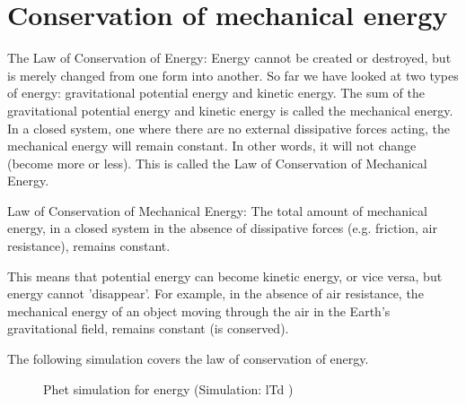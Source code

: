 \section{Conservation of mechanical energy}\nopagebreak
{} { The Law of Conservation of Energy: Energy cannot be created or destroyed, but is merely changed from one form into another.  } 
        \label{m38786*id68483}So far we have looked at two types of energy: gravitational potential energy and kinetic energy. 
The sum of the gravitational potential energy and kinetic energy is called the mechanical energy. 
In a closed system, one where there are no external dissipative forces acting, the mechanical energy will remain constant. 
In other words, it will not change (become more or less). This is called the Law of Conservation of Mechanical Energy. 

 { Law of Conservation of Mechanical Energy: The total amount of mechanical energy, in a closed system in the absence of dissipative forces (e.g. friction, air resistance), remains constant.  } 

This means that potential energy can become kinetic energy, or vice versa, but energy cannot 'disappear'. 
For example, in the absence of air resistance, the mechanical energy of an object moving through the air in the Earth's gravitational field, remains constant (is conserved).



The following simulation covers the law of conservation of energy. \newline
    \setcounter{subfigure}{0}
	\begin{figure}[H] %
    \textnormal{Phet simulation for energy} \nopagebreak
  \label{m38806*phet!!!underscore!!!sim}\label{m38806*phet-simulation}
             { (Simulation:  lTd )}
 \end{figure}       \par 
      \label{m38786*uid79}


